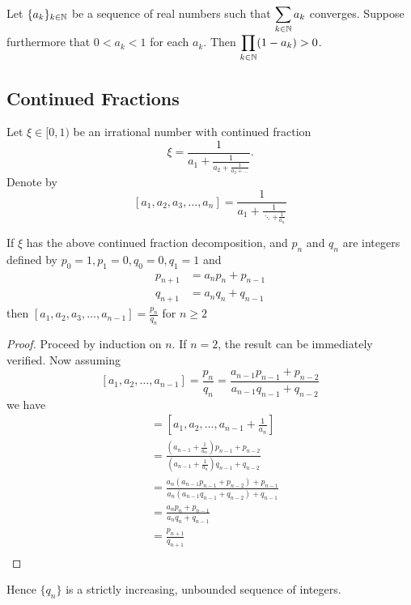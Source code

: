 \begin{thm}\label{ax:thm:product-2}
Let $\{a_k\}_{k \in \mathbb{N}}$ be a sequence of real numbers such that
$\displaystyle \sum_{k \in \mathbb{N}} a_k$
converges. Suppose furthermore that $0 < a_k < 1$ for each $a_k$. Then $\displaystyle \prod_{k\in \mathbb{N}} (1-a_k) > 0$.
\end{thm}

\subsection{Continued Fractions}
Let $\xi \in [0,1)$ be an irrational number with continued fraction
\[
\xi = \frac{1}{a_1 + \frac{1}{a_2 + \frac{1}{a_3 + \dots}}}.
\]
Denote by
\[
[a_1, a_2, a_3, \dots, a_n] = \frac{1}{a_1 + \frac{1}{\ddots + \frac{1}{a_n}}}
\]

\begin{lem}\label{continuedrecurrence}
If $\xi$ has the above continued fraction decomposition, and $p_{n}$ and $q_{n}$ are integers defined by
$p_{0} = 1, p_{1} = 0, q_{0} = 0, q_{1} = 1$ and
    \begin{align*}
        p_{n+1} &= a_{n}p_{n} + p_{n-1}\\
        q_{n+1} &= a_{n}q_{n} + q_{n-1}
    \end{align*}
then $[a_1, a_2, a_3, \dots, a_{n-1}] = \frac{p_{n}}{q_{n}}$ for $n \geq 2$
\end{lem}
\begin{proof}
Proceed by induction on $n$. If $n = 2$, the result can be immediately verified. Now assuming
\[
[a_1, a_2, \dots, a_{n-1}] = \frac{p_{n}}{q_{n}} = \frac{a_{n-1}p_{n-1} + p_{n-2}}{a_{n-1}q_{n-1} + q_{n-2}}
\]
we have
\begin{align*}
    [a_1, a_2, \dots, a_{n-1}, a_n] &= \left[a_1, a_2, \dots, a_{n-1} + \frac{1}{a_n}\right]\\
    & = \frac{\left(a_{n-1} + \frac{1}{a_n}\right)p_{n-1} + p_{n-2}}{\left(a_{n-1} + \frac{1}{a_n}\right)q_{n-1} + q_{n-2}}\\
    & = \frac{a_{n}(a_{n-1}p_{n-1} + p_{n-2}) + p_{n-1}}{a_{n}(a_{n-1}q_{n-1} + q_{n-2}) + q_{n-1}}\\
    & = \frac{a_{n}p_{n} + p_{n-1}}{a_{n}q_{n} + q_{n-1}}\\
    & = \frac{p_{n+1}}{q_{n+1}}\\
\end{align*}
\end{proof}
Hence $\{q_{n}\}$ is a strictly increasing, unbounded sequence of integers.

